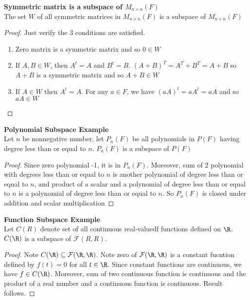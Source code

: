 \documentclass[11pt]{article}
\begin{document}
\begin{defn*}
    \textbf{Symmetric matrix is a subspace of $M_{n\times n}(F)$} \\ 
    The set $W$ of all symmetric matrices in $M_{n\times n}(F)$ is a subspace of $M_{n\times n}(F)$
    \begin{proof}
        Just verify the 3 conditions are satisfied. 
        \begin{enumerate}
            \item Zero matrix is a symmetric matrix and so $0\in W$
            \item If $A,B\in W$, then $A^t = A$ and $B^t = B$. $(A+B)^T = A^T+B^T = A+B$ so $A+B$ is a symmetric matrix and so $A+B\in W$ 
            \item If $A\in W$ then $A^t = A$. For any $a\in F$, we have $(aA)^t = aA^t = aA$ and so $aA \in W$ 
        \end{enumerate}
    \end{proof}
\end{defn*}


\begin{defn*}
    \textbf{Polynomial Subspace Example} \\
    Let $n$ be nonnegative number, let $P_n(F)$ be all polynomials in $P(F)$ having degree less than or equal to $n$. $P_n(F)$ is a subspace of $P(F)$ 
    \begin{proof}
        Since zero polynomial -1, it is in $P_n(F)$. Moreover, sum of 2 polynomial with degrees less than or equal to $n$ is another polynomial of degree less than or equal to $n$, and product of a scalar and a polynomial of degree less than or equal to $n$ is a polynomial of degree less than or equal to $n$. So $P_n(F)$ is closed under addition and scalar multiplication 
    \end{proof} 
\end{defn*}

\begin{defn*}
    \textbf{Function Subspace Example} \\
    Let $C(R)$ denote set of all continuous real-valuedf functions defined on $\R$. $C(\R)$ is a subspace of $\mathcal{F}(R,R)$. 
    \begin{proof}
        Note $C(\R)\subseteq \mathcal{F}(\R,\R)$. Note zero of $\mathcal{F}(\R,\R)$ is a constant fucntion defined by $f(t)=0$ for all $t\in\R$. Since constant functions are continuous, we have $f\in C(\R)$. Moreover, sum of two continuous function is continuous and the product of a real number and a continuous function is continuous. Result follows.
    \end{proof}
\end{defn*}
\end{document}

